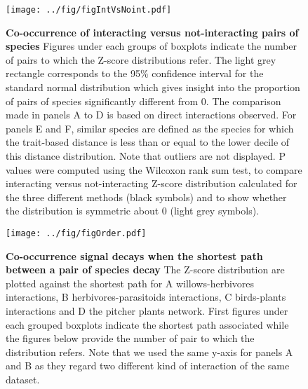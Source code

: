 \newpage

\begin{figure}[htbp]
\centering
\texttt{[image: ../fig/figIntVsNoint.pdf]}
\caption{\textbf{Co-occurrence of interacting versus not-interacting
pairs of species} Figures under each groups of boxplots indicate the
number of pairs to which the Z-score distributions refer. The light grey
rectangle corresponds to the 95\% confidence interval for the standard
normal distribution which gives insight into the proportion of pairs of
species significantly different from 0. The comparison made in panels A
to D is based on direct interactions observed. For panels E and F,
similar species are defined as the species for which the trait-based
distance is less than or equal to the lower decile of this distance
distribution. Note that outliers are not displayed. P values were
computed using the Wilcoxon rank sum test, to compare interacting versus
not-interacting Z-score distribution calculated for the three different
methods (black symbols) and to show whether the distribution is
symmetric about 0 (light grey symbols).\label{fig:synth}}
\end{figure}

\newpage

\begin{figure}[htbp]
\centering
\texttt{[image: ../fig/figOrder.pdf]}
\caption{\textbf{Co-occurrence signal decays when the shortest path
between a pair of species decay } The Z-score distribution are plotted
against the shortest path for A willows-herbivores interactions, B
herbivores-parasitoids interactions, C birds-plants interactions and D
the pitcher plants network. First figures under each grouped boxplots
indicate the shortest path associated while the figures below provide
the number of pair to which the distribution refers. Note that we used
the same y-axis for panels A and B as they regard two different kind of
interaction of the same dataset.\label{fig:shtpth}}
\end{figure}

\newpage

